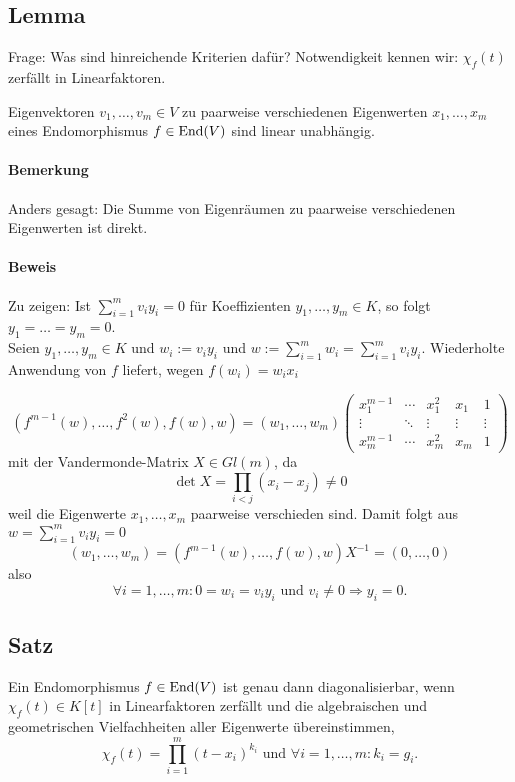 
\subsection{Lemma}
	Frage: Was sind hinreichende Kriterien dafür? Notwendigkeit kennen wir: $ \chi_f(t) $ zerfällt in Linearfaktoren.
	
	\begin{Lemma}
		Eigenvektoren $ v_1,\dots,v_m\in V $ zu paarweise verschiedenen Eigenwerten $ x_1,\dots,x_m $ eines Endomorphismus $ f\in\operatorname{End}(V) $ sind linear unabhängig.
	\end{Lemma}
\paragraph{Bemerkung}
	Anders gesagt: Die Summe von Eigenräumen zu paarweise verschiedenen Eigenwerten ist direkt.
\paragraph{Beweis}
	Zu zeigen: Ist $ \sum_{i=1}^m v_iy_i = 0 $ für Koeffizienten $ y_1,\dots,y_m\in K $, so folgt $ y_1 = \dots = y_m = 0 $.\\	
	Seien $ y_1,\dots,y_m \in K $ und $ w_i := v_iy_i $ und $ w:= \sum_{i=1}^{m}w_i = \sum_{i=1}^{m}v_iy_i$.
	Wiederholte Anwendung von $ f $ liefert, wegen $ f(w_i) = w_ix_i $
	
		\[ (f^{m-1}(w),\dots,f^2(w),f(w),w) = (w_1,\dots,w_m)
		\begin{pmatrix}
		 x_1^{m-1}&\cdots&x_1^2&x_1&1 \\
		 \vdots&\ddots&\vdots&\vdots&\vdots\\
		 x_m^{m-1}&\cdots&x_m^2&x_m & 1
		\end{pmatrix} \]
	mit der Vandermonde-Matrix $ X\in Gl(m) $, da
		\[ \det X = \prod_{i<j} (x_i - x_j)\neq 0 \]
	weil die Eigenwerte $ x_1,\dots,x_m $ paarweise verschieden sind.
	Damit folgt aus $ w=\sum_{i=1}^{m}v_iy_i = 0 $
		\[ (w_1,\dots,w_m)=(f^{m-1}(w),\dots,f(w),w)X^{-1} = (0,\dots,0) \]
	also
		\[ \forall i=1,\dots,m: 0 = w_i = v_iy_i \text{ und }v_i \neq 0 \Rightarrow y_i = 0.  \]
\subsection{Satz}
    \begin{Satz}
		Ein Endomorphismus $ f\in \operatorname{End}(V) $ ist genau dann diagonalisierbar, wenn $ \chi_f(t) \in K[t] $ in Linearfaktoren zerfällt und die algebraischen und geometrischen Vielfachheiten aller Eigenwerte übereinstimmen,
			\[ \chi_f(t) = \prod_{i=1}^{m}(t-x_i)^{k_i} \text{ und } \forall i=1,\dots,m: k_i = g_i.\]
	\end{Satz}
